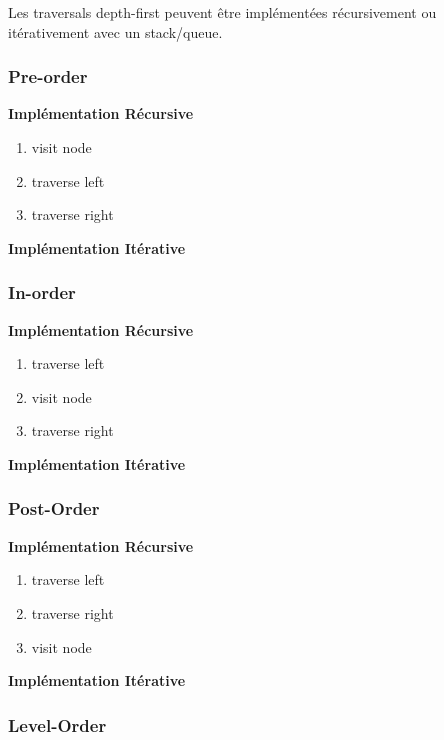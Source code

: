 \documentclass{article}
\begin{document}
Les traversals depth-first peuvent être implémentées récursivement ou
itérativement avec un stack/queue.

\subsubsection{Pre-order}%
\label{ssub:Pre-order}

\textbf{Implémentation Récursive}

\begin{enumerate}
    \item visit node
    \item traverse left
    \item traverse right
\end{enumerate}

\textbf{Implémentation Itérative}

\subsubsection{In-order}%
\label{ssub:In-order}

\textbf{Implémentation Récursive}

\begin{enumerate}
    \item traverse left
    \item visit node
    \item traverse right
\end{enumerate}

\textbf{Implémentation Itérative}

\subsubsection{Post-Order}%
\label{ssub:Post-Order}

\textbf{Implémentation Récursive}

\begin{enumerate}
    \item traverse left
    \item traverse right
    \item visit node
\end{enumerate}

\textbf{Implémentation Itérative}

\subsubsection{Level-Order}%
\label{ssub:Level-Order}
\end{document}

